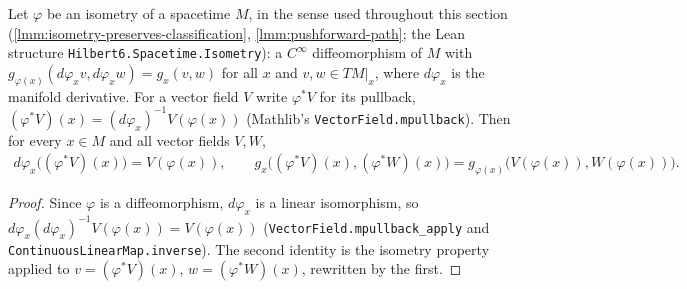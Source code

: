 \begin{lemma}
    \label{lmm:isometry-pullback-metric}
    \leanok
    Let $\varphi$ be an isometry of a spacetime $M$, in the sense used throughout this section (\ref{lmm:isometry-preserves-classification}, \ref{lmm:pushforward-path}; the Lean structure \texttt{Hilbert6.Spacetime.Isometry}): a $C^\infty$ diffeomorphism of $M$ with $g_{\varphi(x)}(d\varphi_x v, d\varphi_x w) = g_x(v,w)$ for all $x$ and $v, w \in TM|_x$, where $d\varphi_x$ is the manifold derivative. For a vector field $V$ write $\varphi^* V$ for its pullback, $(\varphi^* V)(x) = (d\varphi_x)^{-1} V(\varphi(x))$ (Mathlib's \texttt{VectorField.mpullback}). Then for every $x \in M$ and all vector fields $V, W$,
    \begin{align}
        d\varphi_x\big((\varphi^* V)(x)\big) = V(\varphi(x)), \qquad g_x\big((\varphi^* V)(x), (\varphi^* W)(x)\big) = g_{\varphi(x)}\big(V(\varphi(x)), W(\varphi(x))\big).
    \end{align}
\end{lemma}
\begin{proof}
    \leanok
    Since $\varphi$ is a diffeomorphism, $d\varphi_x$ is a linear isomorphism, so $d\varphi_x (d\varphi_x)^{-1} V(\varphi(x)) = V(\varphi(x))$ (\texttt{VectorField.mpullback\_apply} and \texttt{ContinuousLinearMap.inverse}). The second identity is the isometry property applied to $v = (\varphi^* V)(x)$, $w = (\varphi^* W)(x)$, rewritten by the first.
\end{proof}

